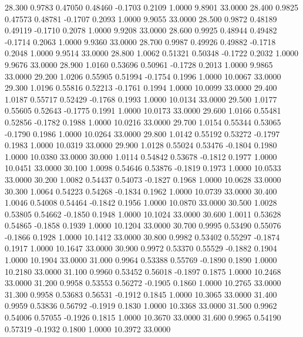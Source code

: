   28.300   0.9783   0.47050   0.48460  -0.1703   0.2109   1.0000   9.8901  33.0000
  28.400   0.9825   0.47573   0.48781  -0.1707   0.2093   1.0000   9.9055  33.0000
  28.500   0.9872   0.48189   0.49119  -0.1710   0.2078   1.0000   9.9208  33.0000
  28.600   0.9925   0.48944   0.49482  -0.1714   0.2063   1.0000   9.9360  33.0000
  28.700   0.9987   0.49926   0.49882  -0.1718   0.2048   1.0000   9.9514  33.0000
  28.800   1.0062   0.51321   0.50348  -0.1722   0.2032   1.0000   9.9676  33.0000
  28.900   1.0160   0.53696   0.50961  -0.1728   0.2013   1.0000   9.9865  33.0000
  29.200   1.0206   0.55905   0.51994  -0.1754   0.1996   1.0000  10.0067  33.0000
  29.300   1.0196   0.55816   0.52213  -0.1761   0.1994   1.0000  10.0099  33.0000
  29.400   1.0187   0.55717   0.52429  -0.1768   0.1993   1.0000  10.0134  33.0000
  29.500   1.0177   0.55605   0.52643  -0.1775   0.1991   1.0000  10.0173  33.0000
  29.600   1.0166   0.55481   0.52856  -0.1782   0.1988   1.0000  10.0216  33.0000
  29.700   1.0154   0.55344   0.53065  -0.1790   0.1986   1.0000  10.0264  33.0000
  29.800   1.0142   0.55192   0.53272  -0.1797   0.1983   1.0000  10.0319  33.0000
  29.900   1.0128   0.55024   0.53476  -0.1804   0.1980   1.0000  10.0380  33.0000
  30.000   1.0114   0.54842   0.53678  -0.1812   0.1977   1.0000  10.0451  33.0000
  30.100   1.0098   0.54646   0.53876  -0.1819   0.1973   1.0000  10.0533  33.0000
  30.200   1.0082   0.54437   0.54073  -0.1827   0.1968   1.0000  10.0628  33.0000
  30.300   1.0064   0.54223   0.54268  -0.1834   0.1962   1.0000  10.0739  33.0000
  30.400   1.0046   0.54008   0.54464  -0.1842   0.1956   1.0000  10.0870  33.0000
  30.500   1.0028   0.53805   0.54662  -0.1850   0.1948   1.0000  10.1024  33.0000
  30.600   1.0011   0.53628   0.54865  -0.1858   0.1939   1.0000  10.1204  33.0000
  30.700   0.9995   0.53490   0.55076  -0.1866   0.1928   1.0000  10.1412  33.0000
  30.800   0.9982   0.53402   0.55297  -0.1874   0.1917   1.0000  10.1647  33.0000
  30.900   0.9972   0.53370   0.55529  -0.1882   0.1904   1.0000  10.1904  33.0000
  31.000   0.9964   0.53388   0.55769  -0.1890   0.1890   1.0000  10.2180  33.0000
  31.100   0.9960   0.53452   0.56018  -0.1897   0.1875   1.0000  10.2468  33.0000
  31.200   0.9958   0.53553   0.56272  -0.1905   0.1860   1.0000  10.2765  33.0000
  31.300   0.9958   0.53683   0.56531  -0.1912   0.1845   1.0000  10.3065  33.0000
  31.400   0.9959   0.53836   0.56792  -0.1919   0.1830   1.0000  10.3368  33.0000
  31.500   0.9962   0.54006   0.57055  -0.1926   0.1815   1.0000  10.3670  33.0000
  31.600   0.9965   0.54190   0.57319  -0.1932   0.1800   1.0000  10.3972  33.0000
